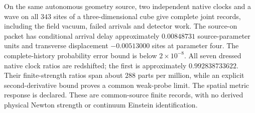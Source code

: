 On the same autonomous geometry source, two independent native clocks and
a wave on all \(343\) sites of a three-dimensional cube give complete joint
records, including the field vacuum, failed arrivals and detector work.
The source-on packet has conditional arrival delay approximately
\(0.00848731\) source-parameter units and transverse displacement
\(-0.00513000\) sites at parameter four. The complete-history probability
error bound is below \(2\times10^{-8}\).
All seven dressed native clock ratios are redshifted; the first is
approximately \(0.992838733622\). Their finite-strength ratios span about
\(288\) parts per million, while an explicit second-derivative bound proves
a common weak-probe limit. The spatial metric response is declared.
These are common-source finite records, with no derived physical Newton
strength or continuum Einstein identification.
